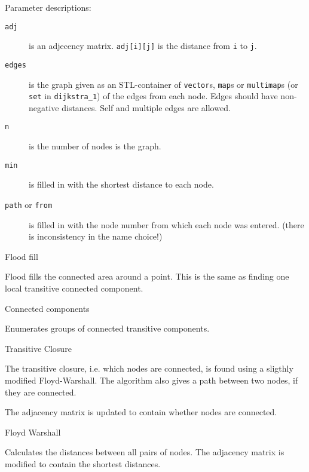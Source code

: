 
Parameter descriptions:
\begin{description}
\item[{\tt adj}] is an adjecency matrix. {\tt adj[i][j]} is the distance
   from {\tt i} to {\tt j}.
\item[{\tt edges}] is the graph given as an STL-container of
   {\tt vector}s, {\tt map}s or {\tt multimap}s
   (or {\tt set} in {\tt dijkstra\_1}) of the edges from each node.
   Edges should have non-negative distances.
   Self and multiple edges are allowed.
\item[{\tt n}] is the number of nodes is the graph.
\item[{\tt min}] is filled in with the shortest distance to each node.
\item[{\tt path} or {\tt from}] is filled in with the node number from which
   each node was entered. (there is inconsistency in the name choice!)
\end{description}

\begin{algorithm}{Flood fill}
\keyword{}

Flood fills the connected area around a point. This is the same as finding
one local transitive connected component.
\end{algorithm}

\begin{algorithm}{Connected components}
\keyword{}

Enumerates groups of connected transitive components.
\end{algorithm}

\begin{algorithm}{Transitive Closure}

The transitive closure, i.e. which nodes are connected, is found using
a sligthly modified Floyd-Warshall. The algorithm also gives a path between
two nodes, if they are connected.

The adjacency matrix is updated to contain whether nodes are connected.
\end{algorithm}

\begin{algorithm}{Floyd Warshall}

Calculates the distances between all pairs of nodes.
The adjacency matrix is modified to contain the shortest distances.
\end{algorithm}

